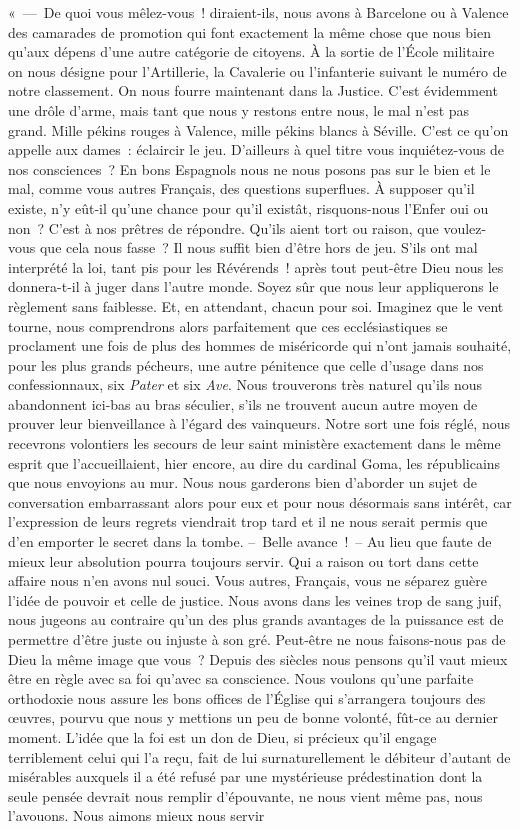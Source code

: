 \documentclass[french,twoside]{book} %
\begin{document}
« — De quoi vous mêlez-vous ! diraient-ils, nous avons à Barcelone ou à Valence des camarades de promotion qui font exactement la même chose que nous bien qu’aux dépens d’une autre catégorie de citoyens. À la sortie de l’École militaire on nous désigne pour l’Artillerie, la Cavalerie ou l’infanterie suivant le numéro de notre classement. On nous fourre maintenant dans la Justice. C’est évidemment une drôle d’arme, mais tant que nous y restons entre nous, le mal n’est pas grand. Mille pékins rouges à Valence, mille pékins blancs à Séville. C’est ce qu’on appelle aux dames : éclaircir le jeu. D’ailleurs à quel titre vous inquiétez-vous de nos consciences ? En bons Espagnols nous ne nous posons pas sur le bien et le mal, comme vous autres Français, des questions superflues. À supposer qu’il existe, n’y eût-il qu’une chance pour qu’il existât, risquons-nous l’Enfer oui ou non ? C’est à nos prêtres de répondre. Qu’ils aient tort ou raison, que voulez-vous que cela nous fasse ? Il nous suffit bien d’être hors de jeu. S’ils ont mal interprété la loi, tant pis pour les Révérends ! après tout peut-être Dieu nous les donnera-t-il à juger dans l’autre monde. Soyez sûr que nous leur appliquerons le règlement sans faiblesse. Et, en attendant, chacun pour soi. Imaginez que le vent tourne, nous comprendrons alors parfaitement que ces ecclésiastiques se proclament une fois de plus des hommes de miséricorde qui n’ont jamais souhaité, pour les plus grands pécheurs, une autre pénitence que celle d’usage dans nos confessionnaux, six \emph{Pater} et six \emph{Ave}. Nous trouverons très naturel qu’ils nous abandonnent ici-bas au bras séculier, s’ils ne trouvent aucun autre moyen de prouver leur bienveillance à l’égard des vainqueurs. Notre sort une fois réglé, nous recevrons volontiers les secours de leur saint ministère exactement dans le même esprit que l’accueillaient, hier encore, au dire du cardinal Goma, les républicains que nous envoyions au mur. Nous nous garderons bien d’aborder un sujet de conversation embarrassant alors pour eux et pour nous désormais sans intérêt, car l’expression de leurs regrets viendrait trop tard et il ne nous serait permis que d’en emporter le secret dans la tombe. – Belle avance ! – Au lieu que faute de mieux leur absolution pourra toujours servir. Qui a raison ou tort dans cette affaire nous n’en avons nul souci. Vous autres, Français, vous ne séparez guère l’idée de pouvoir et celle de justice. Nous avons dans les veines trop de sang juif, nous jugeons au contraire qu’un des plus grands avantages de la puissance est de permettre d’être juste ou injuste à son gré. Peut-être ne nous faisons-nous pas de Dieu la même image que vous ? Depuis des siècles nous pensons qu’il vaut mieux être en règle avec sa foi qu’avec sa conscience. Nous voulons qu’une parfaite orthodoxie nous assure les bons offices de l’Église qui s’arrangera toujours des œuvres, pourvu que nous y mettions un peu de bonne volonté, fût-ce au dernier moment. L’idée que la foi est un don de Dieu, si précieux qu’il engage terriblement celui qui l’a reçu, fait de lui surnaturellement le débiteur d’autant de misérables auxquels il a été refusé par une mystérieuse prédestination dont la seule pensée devrait nous remplir d’épouvante, ne nous vient même pas, nous l’avouons. Nous aimons mieux nous servir 
\end{document}
